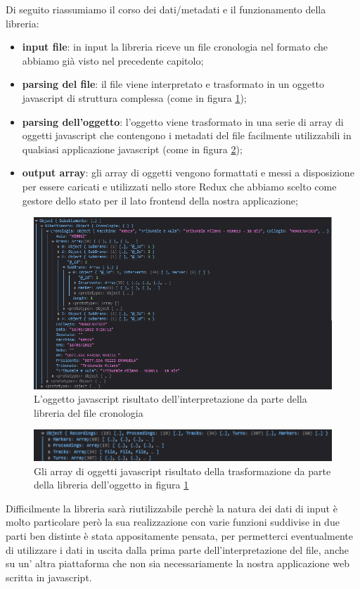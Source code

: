 Di seguito riassumiamo il corso dei dati/metadati e il funzionamento della libreria:
\begin{itemize}
  \item \textbf{input file}: in input la libreria riceve un file cronologia nel formato che abbiamo già visto nel precedente capitolo;
  \item \textbf{parsing del file}: il file viene interpretato e trasformato in un oggetto javascript di struttura complessa (come in figura \ref{fig:libreria-parsing});
  \item \textbf{parsing dell'oggetto}: l'oggetto viene trasformato in una serie di array di oggetti javascript che contengono i metadati del file facilmente utilizzabili
        in qualsiasi applicazione javascript (come in figura \ref{fig:libreria-object});
  \item \textbf{output array}: gli array di oggetti vengono formattati e messi a disposizione per essere caricati e utilizzati nello store Redux che abbiamo scelto come
        gestore dello stato per il lato frontend della nostra applicazione;
\end{itemize}
\begin{figure}[H]
  \centering
  \includegraphics[width=\textwidth]{immagini/libreria-file-parsing.png}
  \caption{L'oggetto javascript risultato dell'interpretazione da parte della libreria del file cronologia}
  \label{fig:libreria-parsing}
\end{figure}
\begin{figure}[H]
  \centering
  \includegraphics[width=\textwidth]{immagini/libreria-parsing-objects.png}
  \caption{Gli array di oggetti javascript risultato della trasformazione da parte della libreria dell'oggetto in figura \ref{fig:libreria-parsing}}
  \label{fig:libreria-object}
\end{figure}
Difficilmente la libreria sarà riutilizzabile perchè la natura dei dati di input è molto particolare però la sua realizzazione con varie funzioni suddivise in due parti
ben distinte è stata appositamente pensata, per permetterci eventualmente di utilizzare i dati in uscita dalla prima parte dell'interpretazione del file, anche su
un' altra piattaforma che non sia necessariamente la nostra applicazione web scritta in javascript.


